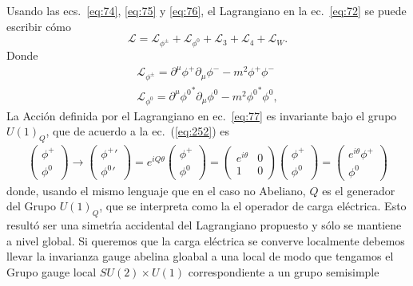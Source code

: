 Usando las ecs.~\eqref{eq:74}, \eqref{eq:75} y \eqref{eq:76}, el Lagrangiano en la ec.~\eqref{eq:72} se puede escribir c\'omo
\begin{equation}
  \label{eq:77}
  \mathcal{L}=\mathcal{L}_{\phi^\pm}+\mathcal{L}_{\phi^0}+\mathcal{L}_3+\mathcal{L}_4+\mathcal{L}_W.
\end{equation}
Donde
\begin{align}
  \mathcal{L}_{\phi^\pm}=\partial^\mu\phi^+\partial_\mu\phi^--m^2\phi^+\phi^-\nonumber\\
  \mathcal{L}_{\phi^0}=\partial^\mu{\phi^0}^*\partial_\mu\phi^0-m^2{\phi^0}^*\phi^0,
\end{align}
La Acci\'on definida por el Lagrangiano en ec.~\eqref{eq:77} es invariante bajo el grupo $U(1)_Q$, que de acuerdo a la ec.~(\ref{eq:252}) es
\begin{align}
    \begin{pmatrix}
    \phi^+\\
    \phi^0
  \end{pmatrix}\to   \begin{pmatrix}
    {\phi^+}'\\
    {\phi^0}'
  \end{pmatrix}=e^{i Q \theta}    \begin{pmatrix}
    \phi^+\\
    \phi^0
  \end{pmatrix}=\begin{pmatrix}
    e^{i\theta}&0\\
    1&0
  \end{pmatrix}    \begin{pmatrix}
    \phi^+\\
    \phi^0
  \end{pmatrix}=\begin{pmatrix}
    e^{i \theta }\phi^+\\
    \phi^0
  \end{pmatrix}
\end{align}
donde, usando el mismo lenguaje que en el caso no Abeliano, $Q$ es el generador del Grupo $U(1)_Q$, que se interpreta como la el operador de carga el\'ectrica. Esto result\'o ser una simetr\'\i a accidental del Lagrangiano propuesto y s\'olo se mantiene a nivel global. Si queremos que la carga el\'ectrica se converve localmente debemos llevar la invarianza gauge abelina gloabal a una local de modo que tengamos el Grupo gauge local $SU(2)\times U(1)$ correspondiente a un grupo semisimple

